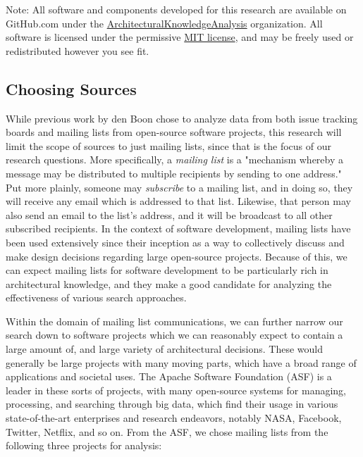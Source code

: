\documentclass[a4paper, 12pt]{article}
\begin{document}
	\footnotesize
	Note: All software and components developed for this research are available on GitHub.com under the \href{https://github.com/ArchitecturalKnowledgeAnalysis}{ArchitecturalKnowledgeAnalysis} organization. All software is licensed under the permissive \href{https://en.wikipedia.org/wiki/MIT_License}{MIT license}, and may be freely used or redistributed however you see fit.
	\normalsize
	
	\subsection{Choosing Sources}
		While previous work by den Boon chose to analyze data from both issue tracking boards and mailing lists from open-source software projects\autocite{denboon}, this research will limit the scope of sources to just mailing lists, since that is the focus of our research questions. More specifically, a \textit{mailing list} is a "mechanism whereby a message may be distributed to multiple recipients by sending to one address."\autocite{mailinglistrfc} Put more plainly, someone may \textit{subscribe} to a mailing list, and in doing so, they will receive any email which is addressed to that list. Likewise, that person may also send an email to the list's address, and it will be broadcast to all other subscribed recipients. In the context of software development, mailing lists have been used extensively since their inception as a way to collectively discuss and make design decisions regarding large open-source projects. Because of this, we can expect mailing lists for software development to be particularly rich in architectural knowledge, and they make a good candidate for analyzing the effectiveness of various search approaches.
		
		Within the domain of mailing list communications, we can further narrow our search down to software projects which we can reasonably expect to contain a large amount of, and large variety of architectural decisions. These would generally be large projects with many moving parts, which have a broad range of applications and societal uses. The Apache Software Foundation (ASF) is a leader in these sorts of projects, with many open-source systems for managing, processing, and searching through big data, which find their usage in various state-of-the-art enterprises and research endeavors, notably NASA, Facebook, Twitter, Netflix, and so on\autocite{akhtar}. From the ASF, we chose mailing lists from the following three projects for analysis:
		
\end{document}
